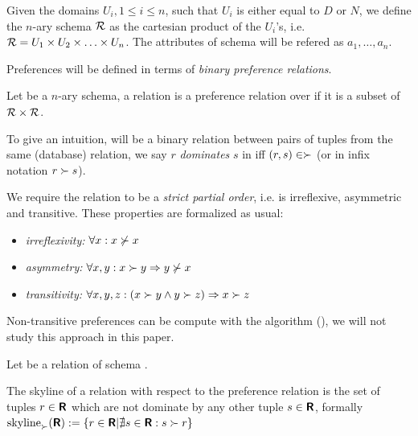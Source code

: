 \begin{definition}[Schema]
Given the domains $U_i, 1 \le i \le n$, such that $U_i$ is either equal to $D$ or $N$, we define the $n$-ary schema $\mathcal{R}$ as the cartesian product of the $U_i$'s, i.e. $\mathcal{R} = U_1 \times U_2 \times \ldots \times U_n$. The attributes of schema  will be refered as $a_1, \ldots, a_n$.
\end{definition}

Preferences will be defined in terms of \emph{binary preference relations}.
\begin{definition}
Let  be a $n$-ary schema, a relation \dominates is a preference relation over  if it is a subset of $\mathcal{R} \times \mathcal{R}$.
\end{definition}

To give an intuition, \dominates will be a binary relation between pairs of tuples from the same (database) relation, we say $r$ \emph{dominates} $s$ in \dominates iff $(r, s) \in \succ$ (or in infix notation $r \succ s$).

We require the relation \dominates to be a \emph{strict partial order}, i.e. \dominates is irreflexive, asymmetric and transitive. These properties are formalized as usual:

\begin{itemize}
\item \emph{irreflexivity:} $\forall x: x \not\succ x$
\item \emph{asymmetry:} $\forall x, y: x \succ y \Rightarrow y \not\succ x$
\item \emph{transitivity:} $\forall x, y, z: (x \succ y \land y \succ z) \Rightarrow x \succ z$
\end{itemize}

Non-transitive preferences can be compute with the  algorithm (\citep{Torlone2002, Ciaccia2004}), we will not study this approach in this paper.

\begin{definition}
\todo{}{}Let  be a relation of schema .
\end{definition}

\begin{definition}[Skyline]
The skyline of a relation  with respect to the preference relation \dominates is the set of tuples $r \in \textnormal{\bf\textsf{R}}$ which are not dominate by any other tuple $s \in \textnormal{\bf\textsf{R}}$, formally $\skyline_\dominates(\relation{R}) := \{ r \in \relation{R} | \nexists s \in \relation{R} : s \dominates r \}$
\end{definition}

